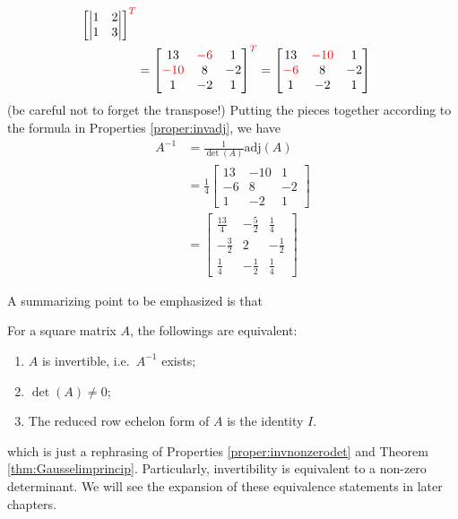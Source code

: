 \begin{solution}
\begin{align*}
\begin{bmatrix*}[r]
\begin{vmatrix}
1 & 2 \\
1 & 3 
\end{vmatrix} 
\end{bmatrix*}^{\color{red}{T}} \\
&= 
\begin{bmatrix}
13 & \textcolor{red}{-6} & 1 \\
\textcolor{red}{-10} & 8 & -2 \\
1 & -2 & 1
\end{bmatrix}^{\color{red}{T}} = 
\begin{bmatrix}
13 & \textcolor{red}{-10} & 1 \\
\textcolor{red}{-6} & 8 & -2 \\
1 & -2 & 1
\end{bmatrix}
\end{align*}
(be careful not to forget the transpose!) Putting the pieces together according to the formula in Properties \ref{proper:invadj}, we have
\begin{align*}
A^{-1} &= \frac{1}{\det(A)}\text{adj}(A) \\
&= \frac{1}{4}
\begin{bmatrix}
13 & -10 & 1 \\
-6 & 8 & -2 \\
1 & -2 & 1
\end{bmatrix} \\
&= 
\begin{bmatrix}
\frac{13}{4} & -\frac{5}{2} & \frac{1}{4} \\
-\frac{3}{2} & 2 & -\frac{1}{2} \\
\frac{1}{4} & -\frac{1}{2} & \frac{1}{4}
\end{bmatrix}
\end{align*}
\end{solution}
A summarizing point to be emphasized is that
\begin{thm}
\label{thm:equiv1}
For a square matrix $A$, the followings are equivalent:
\begin{enumerate}[label=(\alph*)]
\item $A$ is invertible, i.e.\ $A^{-1}$ exists;
\item $\det(A) \neq 0$;
\item The reduced row echelon form of $A$ is the identity $I$.
\end{enumerate}
\end{thm}
which is just a rephrasing of Properties \ref{proper:invnonzerodet} and Theorem \ref{thm:Gausselimprincip}. Particularly, invertibility is equivalent to a non-zero determinant. We will see the expansion of these equivalence statements in later chapters.

